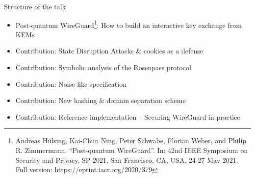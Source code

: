 % 

\begin{frame}{Structure of the talk}
\begin{itemize}
  \item Post-quantum WireGuard\footnote{
	  Andreas Hülsing, Kai-Chun Ning, Peter Schwabe, Florian Weber, and Philip R. Zimmermann. “Post-quantum WireGuard”. In: 42nd IEEE Symposium on Security and Privacy, SP 2021, San Francisco, CA, USA, 24-27 May 2021. Full version: https://eprint.iacr.org/2020/379
	}: How to build an interactive key exchange from KEMs
  \item Contribution: State Disruption Attacks \& cookies as a defense
  \item Contribution: Symbolic analysis of the Rosenpass protocol
  \item Contribution: Noise-like specification
  \item Contribution: New hashing \& domain separation scheme
  \item Contribution: Reference implementation – Securing WireGuard in practice
\end{itemize}
\end{frame}

